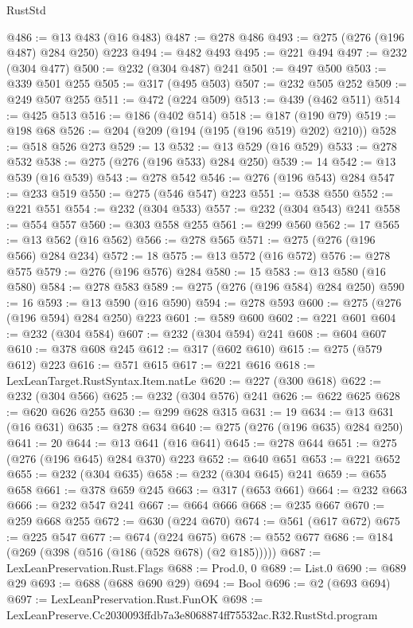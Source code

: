 \begin{lexlean}{RustStd}
\begin{coremodule}
@486 := @13 @483 (@16 @483)
@487 := @278 @486
@493 := @275 (@276 (@196 @487) @284 @250) @223
@494 := @482 @493
@495 := @221 @494
@497 := @232 (@304 @477)
@500 := @232 (@304 @487) @241
@501 := @497 @500
@503 := @339 @501 @255
@505 := @317 (@495 @503)
@507 := @232 @505 @252
@509 := @249 @507 @255
@511 := @472 (@224 @509)
@513 := @439 (@462 @511)
@514 := @425 @513
@516 := @186 (@402 @514)
@518 := @187 (@190 @79)
@519 := @198 @68
@526 := @204 (@209 (@194 (@195 (@196 @519) @202) @210))
@528 := @518 @526 @273
@529 := 13
@532 := @13 @529 (@16 @529)
@533 := @278 @532
@538 := @275 (@276 (@196 @533) @284 @250)
@539 := 14
@542 := @13 @539 (@16 @539)
@543 := @278 @542
@546 := @276 (@196 @543) @284
@547 := @233 @519
@550 := @275 (@546 @547) @223
@551 := @538 @550
@552 := @221 @551
@554 := @232 (@304 @533)
@557 := @232 (@304 @543) @241
@558 := @554 @557
@560 := @303 @558 @255
@561 := @299 @560
@562 := 17
@565 := @13 @562 (@16 @562)
@566 := @278 @565
@571 := @275 (@276 (@196 @566) @284 @234)
@572 := 18
@575 := @13 @572 (@16 @572)
@576 := @278 @575
@579 := @276 (@196 @576) @284
@580 := 15
@583 := @13 @580 (@16 @580)
@584 := @278 @583
@589 := @275 (@276 (@196 @584) @284 @250)
@590 := 16
@593 := @13 @590 (@16 @590)
@594 := @278 @593
@600 := @275 (@276 (@196 @594) @284 @250) @223
@601 := @589 @600
@602 := @221 @601
@604 := @232 (@304 @584)
@607 := @232 (@304 @594) @241
@608 := @604 @607
@610 := @378 @608 @245
@612 := @317 (@602 @610)
@615 := @275 (@579 @612) @223
@616 := @571 @615
@617 := @221 @616
@618 := LexLeanTarget.RustSyntax.Item.natLe
@620 := @227 (@300 @618)
@622 := @232 (@304 @566)
@625 := @232 (@304 @576) @241
@626 := @622 @625
@628 := @620 @626 @255
@630 := @299 @628 @315
@631 := 19
@634 := @13 @631 (@16 @631)
@635 := @278 @634
@640 := @275 (@276 (@196 @635) @284 @250)
@641 := 20
@644 := @13 @641 (@16 @641)
@645 := @278 @644
@651 := @275 (@276 (@196 @645) @284 @370) @223
@652 := @640 @651
@653 := @221 @652
@655 := @232 (@304 @635)
@658 := @232 (@304 @645) @241
@659 := @655 @658
@661 := @378 @659 @245
@663 := @317 (@653 @661)
@664 := @232 @663
@666 := @232 @547 @241
@667 := @664 @666
@668 := @235 @667
@670 := @259 @668 @255
@672 := @630 (@224 @670)
@674 := @561 (@617 @672)
@675 := @225 @547
@677 := @674 (@224 @675)
@678 := @552 @677
@686 := @184 (@269 (@398 (@516 (@186 (@528 @678) (@2 @185)))))
@687 := LexLeanPreservation.Rust.Flags
@688 := Prod.{0, 0}
@689 := List.{0}
@690 := @689 @29
@693 := @688 (@688 @690 @29)
@694 := Bool
@696 := @2 (@693 @694)
@697 := LexLeanPreservation.Rust.FunOK
@698 := LexLeanPreserve.Cc2030093ffdb7a3e8068874ff75532ac.R32.RustStd.program

\end{coremodule}
\end{lexlean}
